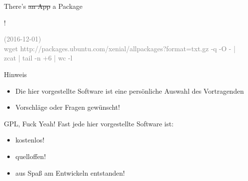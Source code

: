 \begin{frame}{There's \st{an App} a Package}

\begin{center}
{\fontsize{100}{90}!}
\end{center}
\vfill

\textcolor{gray}{\tiny (2016-12-01) \\ wget http://packages.ubuntu.com/xenial/allpackages?format=txt.gz -q -O - | zcat | tail -n +6 | wc -l}
\end{frame}


\begin{frame}{Hinweis}
\begin{itemize}
\item Die hier vorgestellte Software ist eine persönliche Auswahl des Vortragenden
\item Vorschläge oder Fragen gewünscht!
\end{itemize}
\end{frame}

\begin{frame}{GPL, Fuck Yeah!}
Fast jede hier vorgestellte Software ist:
\begin{itemize}
\item kostenlos!
\item quelloffen!
\item aus Spaß am Entwickeln entstanden!
\end{itemize}
\end{frame}